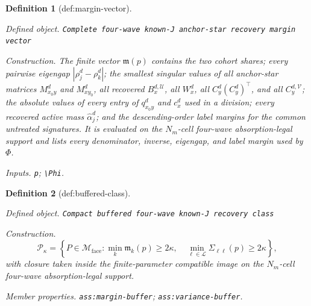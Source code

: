 \documentclass{article}
\newtheorem{definition}{Definition}
\begin{document}
\begin{definition}[def:margin-vector]\label{def:margin-vector}
\par\smallskip\noindent\emph{Defined object.} \texttt{Complete four-\allowbreak{}wave known-\allowbreak{}J anchor-\allowbreak{}star recovery margin vector}
\par\smallskip\noindent\emph{Construction.} The finite vector \(\mathfrak m(p)\) contains the two cohort shares; every pairwise eigengap \(|\rho_j^d-\rho_k^d|\); the smallest singular values of all anchor-star matrices \(M_{x_0y}^d\) and \(M_{xy_0}^d\), all recovered \(B_x^{d,\mathcal U}\), all \(W_x^d\), all \(C_y^d(C_y^d)^\top\), and all \(C_y^{d,\mathcal V}\); the absolute values of every entry of \(q_{x_0y}^d\) and \(c_x^d\) used in a division; every recovered active mass \(\widehat\alpha_j^d\); and the descending-order label margins for the common untreated signatures. It is evaluated on the \(N_m\)-cell four-wave absorption-legal support and lists every denominator, inverse, eigengap, and label margin used by \(\Phi\).
\par\smallskip\noindent\emph{Inputs.} \texttt{p}; \texttt{\textbackslash{}\allowbreak{}Phi}.
\end{definition}

\begin{definition}[def:buffered-class]\label{def:buffered-class}
\par\smallskip\noindent\emph{Defined object.} \texttt{Compact buffered four-\allowbreak{}wave known-\allowbreak{}J recovery class}
\par\smallskip\noindent\emph{Construction.} \[
 \mathcal P_\kappa=\left\{P\in\mathcal M_{\mathrm{face}}:
 \min_k\mathfrak m_k(p)\geq2\kappa,\quad
 \min_{\ell\in\mathcal L}\Sigma_{\ell\ell}(p)\geq2\kappa\right\},
\]
with closure taken inside the finite-parameter compatible image on the \(N_m\)-cell four-wave absorption-legal support.
\par\smallskip\noindent\emph{Member properties.} \texttt{ass:\allowbreak{}margin-\allowbreak{}buffer}; \texttt{ass:\allowbreak{}variance-\allowbreak{}buffer}.
\end{definition}
\end{document}

